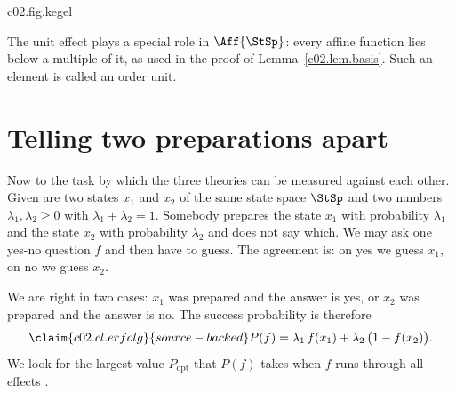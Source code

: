\begin{vertiefung}
  \begin{tpcfigure}{c02.fig.kegel}
    \caption{The two cones of the square bit from \eqref{c02.eq.kegel-quadrat}. (a) The
      cone $\AffDualPos{\StSp}$ of unnormalised states. The state space $\StSp$ is its
      section with the plane $t = 1$; every ray from the origin through the cone meets
      $\StSp$ in exactly one state $x$. (b) The cone $\AffPos{\StSp}$ of positive affine
      functions; $b$ is plotted upwards. The effect set is the dashed double pyramid
      between $0$ and $\UnitEff{\StSp}$ of Figure~\ref{c02.fig.effektmengen}(b). The cone
      in (a) has a square cross-section with sides parallel to the axes, the one in (b) a
      cross-section turned by an eighth of a full turn and narrower: the two cones are not
      equal.}
  \end{tpcfigure}

  The unit effect plays a special role in $\Aff{\StSp}$: every affine function lies below
  a multiple of it, as used in the proof of Lemma~\ref{c02.lem.basis}. Such an element is
  called an order unit.
\end{vertiefung}

\section{Telling two preparations apart}\label{c02.s6}

Now to the task by which the three theories can be measured against each other. Given are
two states $x_1$ and $x_2$ of the same state space $\StSp$ and two numbers
$\lambda_1, \lambda_2 \geq 0$ with $\lambda_1 + \lambda_2 = 1$. Somebody prepares the state
$x_1$ with probability $\lambda_1$ and the state $x_2$ with probability $\lambda_2$ and
does not say which. We may ask one yes-no question $f$ and then have to guess. The
agreement is: on yes we guess $x_1$, on no we guess $x_2$.

We are right in two cases: $x_1$ was prepared and the answer is yes, or $x_2$ was prepared
and the answer is no. The success probability is therefore
\begin{equation}\label{c02.eq.erfolg}\claim{c02.cl.erfolg}{source-backed}
  P(f) = \lambda_1\, f(x_1) + \lambda_2\, \bigl(1 - f(x_2)\bigr) .
\end{equation}
We look for the largest value $P_{\mathrm{opt}}$ that $P(f)$ takes when $f$ runs through
all effects .

